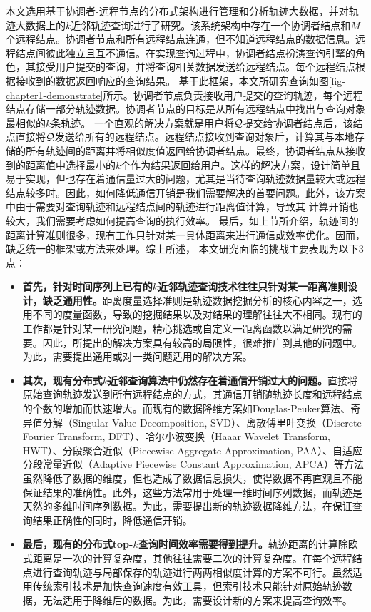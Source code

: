 本文选用基于协调者-远程节点的分布式架构进行管理和分析轨迹大数据，并对轨迹大数据上的$k$近邻轨迹查询进行了研究。该系统架构中存在一个协调者结点和$M$个远程结点。协调者节点和所有远程结点连通，但不知道远程结点的数据信息。远程结点间彼此独立且互不通信。在实现查询过程中，协调者结点扮演查询引擎的角色，其接受用户提交的查询，并将查询相关数据发送给远程结点。每个远程结点根据接收到的数据返回响应的查询结果。
基于此框架，本文所研究查询如图\ref{fig-chapter1-demonstrate}所示。协调者节点负责接收用户提交的查询轨迹，每个远程结点存储一部分轨迹数据。协调者节点的目标是从所有远程结点中找出与查询对象最相似的$k$条轨迹。
一个直观的解决方案就是用户将$\cal Q$提交给协调者结点后，该结点直接将$\cal Q$发送给所有的远程结点。远程结点接收到查询对象后，计算其与本地存储的所有轨迹间的距离并将相似度值返回给协调者结点。最终，协调者结点从接收到的距离值中选择最小的$k$个作为结果返回给用户。这样的解决方案，设计简单且易于实现，但也存在着通信量过大的问题，尤其是当待查询轨迹数据量较大或远程结点较多时。因此，如何降低通信开销是我们需要解决的首要问题。此外，该方案中由于需要对查询轨迹和远程结点间的轨迹进行距离值计算，导致其
计算开销也较大，我们需要考虑如何提高查询的执行效率。
最后，如上节所介绍，轨迹间的距离计算准则很多，现有工作只针对某一具体距离来进行通信或效率优化。因而，缺乏统一的框架或方法来处理。综上所述，
本文研究面临的挑战主要表现为以下3点：
\begin{itemize}
	\item  \textbf{首先，针对时间序列上已有的$k$近邻轨迹查询技术往往只针对某一距离准则设计，缺乏通用性。}距离度量选择准则是轨迹数据挖掘分析的核心内容之一，选用不同的度量函数，导致的挖掘结果以及对结果的理解往往大不相同。现有的工作都是针对某一研究问题，精心挑选或自定义一距离函数以满足研究的需要。因此，所提出的解决方案具有较高的局限性，很难推广到其他的问题中。为此，需要提出通用或对一类问题适用的解决方案。
	
	\item \textbf{其次，现有分布式$k$近邻查询算法中仍然存在着通信开销过大的问题。}直接将原始查询轨迹发送到所有远程结点的方式，其通信开销随轨迹长度和远程结点的个数的增加而快速增大。而现有的数据降维方案如Douglas-Peuker算法、奇异值分解（Singular Value Decomposition, SVD）、离散傅里叶变换（Discrete Fourier Transform, DFT）、哈尔小波变换（Haaar Wavelet Transform, HWT）、分段聚合近似（Piecewise Aggregate Approximation, PAA）、自适应分段常量近似（Adaptive Piecewise Constant Approximation, APCA）等方法虽然降低了数据的维度，但也造成了数据信息损失，使得数据不再直观且不能保证结果的准确性。此外，这些方法常用于处理一维时间序列数据，而轨迹是天然的多维时间序列数据。为此，需要提出新的轨迹数据降维方法，在保证查询结果正确性的同时，降低通信开销。

	\item \textbf{最后，现有的分布式top-$k$查询时间效率需要得到提升。}轨迹距离的计算除欧式距离是一次的计算复杂度，其他往往需要二次的计算复杂度。在每个远程结点进行查询轨迹与局部保存的轨迹进行两两相似度计算的方案不可行。虽然适用传统索引技术是加快查询速度有效工具，但索引技术只能针对原始轨迹数据，无法适用于降维后的数据。为此，需要设计新的方案来提高查询效率。
	
\end{itemize}

